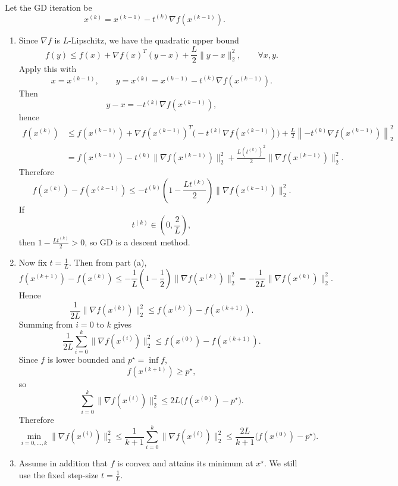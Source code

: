 \documentclass[11pt,letter,notitlepage]{article}
\theoremstyle{definition}
\begin{document}
\newpage

\begin{solution}
Let the GD iteration be
\[
x^{(k)}=x^{(k-1)}-t^{(k)}\nabla f(x^{(k-1)}).
\]

\begin{enumerate}[label=(\alph*)]
    \item Since $\nabla f$ is $L$-Lipschitz, we have the quadratic upper bound
    \[
    f(y)\le f(x)+\nabla f(x)^T(y-x)+\frac{L}{2}\|y-x\|_2^2,
    \qquad \forall x,y.
    \]
    Apply this with
    \[
    x=x^{(k-1)},\qquad y=x^{(k)}=x^{(k-1)}-t^{(k)}\nabla f(x^{(k-1)}).
    \]
    Then
    \[
    y-x=-t^{(k)}\nabla f(x^{(k-1)}),
    \]
    hence
    \[
    \begin{aligned}
    f(x^{(k)})
    &\le
    f(x^{(k-1)})
    +\nabla f(x^{(k-1)})^T\bigl(-t^{(k)}\nabla f(x^{(k-1)})\bigr)
    +\frac{L}{2}\left\|-t^{(k)}\nabla f(x^{(k-1)})\right\|_2^2\\
    &=
    f(x^{(k-1)})
    -t^{(k)}\|\nabla f(x^{(k-1)})\|_2^2
    +\frac{L(t^{(k)})^2}{2}\|\nabla f(x^{(k-1)})\|_2^2.
    \end{aligned}
    \]
    Therefore
    \[
    f(x^{(k)}) - f(x^{(k-1)})
    \le
    -t^{(k)}
    \left(1 - \frac{L t^{(k)}}{2}\right)
    \|\nabla f(x^{(k-1)})\|_2^2.
    \]
    If
    \[
    t^{(k)}\in\left(0,\frac{2}{L}\right),
    \]
    then $1-\frac{Lt^{(k)}}2>0$, so GD is a descent method.

    \item Now fix $t=\frac1L$. Then from part (a),
    \[
    f(x^{(k+1)})-f(x^{(k)})
    \le
    -\frac1L\left(1-\frac12\right)\|\nabla f(x^{(k)})\|_2^2
    =
    -\frac1{2L}\|\nabla f(x^{(k)})\|_2^2.
    \]
    Hence
    \[
    \frac1{2L}\|\nabla f(x^{(k)})\|_2^2
    \le
    f(x^{(k)})-f(x^{(k+1)}).
    \]
    Summing from $i=0$ to $k$ gives
    \[
    \frac1{2L}\sum_{i=0}^k \|\nabla f(x^{(i)})\|_2^2
    \le
    f(x^{(0)})-f(x^{(k+1)}).
    \]
    Since $f$ is lower bounded and $p^\star=\inf f$,
    \[
    f(x^{(k+1)})\ge p^\star,
    \]
    so
    \[
    \sum_{i=0}^k \|\nabla f(x^{(i)})\|_2^2
    \le
    2L\bigl(f(x^{(0)})-p^\star\bigr).
    \]
    Therefore
    \[
    \min_{i=0,\ldots,k}\|\nabla f(x^{(i)})\|_2^2
    \le
    \frac1{k+1}\sum_{i=0}^k \|\nabla f(x^{(i)})\|_2^2
    \le
    \frac{2L}{k+1}\bigl(f(x^{(0)})-p^\star\bigr).
    \]

    \item Assume in addition that $f$ is convex and attains its minimum at $x^\star$. We still use the fixed step-size $t=\frac1L$.


\end{enumerate}
\end{solution}
\end{document}
